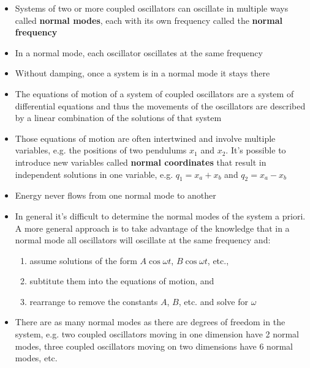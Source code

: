 \documentclass{article}
\begin{document}
\begin{itemize}
  \item Systems of two or more coupled oscillators can oscillate in multiple ways called \textbf{normal modes}, each with its own frequency called the \textbf{normal frequency}

  \item In a normal mode, each oscillator oscillates at the same frequency

  \item Without damping, once a system is in a normal mode it stays there

  \item The equations of motion of a system of coupled oscillators are a system of differential equations and thus the movements of the oscillators are described by a linear combination of the solutions of that system

  \item Those equations of motion are often intertwined and involve multiple variables, e.g. the positions of two pendulums $x_1$ and $x_2$. It's possible to introduce new variables called \textbf{normal coordinates} that result in independent solutions in one variable, e.g. $q_1 = x_a + x_b$ and $q_2 = x_a - x_b$

  \item Energy never flows from one normal mode to another

  \item In general it's difficult to determine the normal modes of the system a priori. A more general approach is to take advantage of the knowledge that in a normal mode all oscillators will oscillate at the same frequency and:

        \begin{enumerate}
          \item assume solutions of the form $A \cos \omega t$, $B \cos \omega t$, etc.,

          \item subtitute them into the equations of motion, and

          \item rearrange to remove the constants $A$, $B$, etc. and solve for $\omega$
        \end{enumerate}

  \item There are as many normal modes as there are degrees of freedom in the system, e.g. two coupled oscillators moving in one dimension have 2 normal modes, three coupled oscillators moving on two dimensions have 6 normal modes, etc.


\end{itemize}
\end{document}
